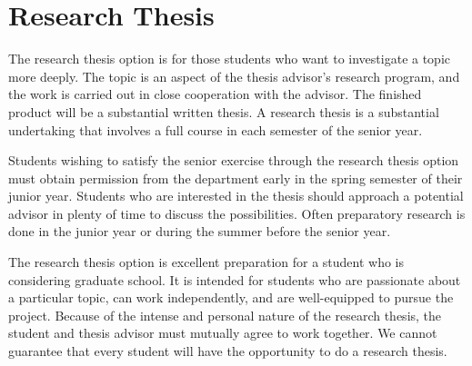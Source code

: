 \documentclass[finalcopy]{srpaper}
\begin{document}
\section{Research Thesis}
The research thesis option is for those students who want to
investigate a topic more deeply. The topic is an aspect of
the thesis advisor's research program, and the work is
carried out in close cooperation with the 
advisor. The
finished product will be a substantial written thesis. A
research thesis is a substantial undertaking that involves
a full course in each semester of the senior year.

Students wishing to satisfy the senior exercise through the
research thesis option must obtain permission from the
department early in the spring semester of their junior
year. Students who are interested in the thesis should
approach a potential advisor in plenty of time to discuss
the possibilities. Often preparatory research is done in the
junior year or during the summer before the senior year.

The research thesis option is excellent preparation for a
student who is considering graduate school. It is intended
for students who are passionate about a particular topic,
can work independently, and are well-equipped to pursue the
project. Because of the intense and personal nature of the
research thesis, the student and thesis 
advisor must
mutually agree to work together. We cannot guarantee that
every student will have the opportunity to do a research
thesis.
\end{document}

